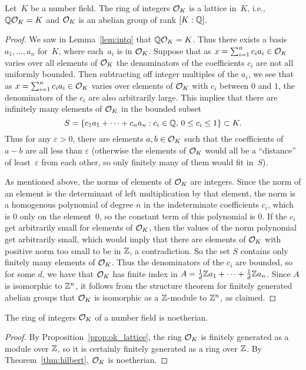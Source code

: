 \begin{proposition}\label{prop:ok_lattice}
  Let~$K$ be a number field.  The ring of integers $\mathcal{O}_K$ is a
  lattice in~$K$, i.e., $\mathbb{Q}\mathcal{O}_K=K$ and $\mathcal{O}_K$ is an abelian group
  of rank $[K:\mathbb{Q}]$.
\end{proposition}
\begin{proof}
  We saw in Lemma~\ref{lem:intq} that $\mathbb{Q}\mathcal{O}_K=K$.  Thus there exists a
  basis $a_1,\dots, a_n$ for~$K$, where each~$a_i$ is in $\mathcal{O}_K$.
  Suppose that as $x=\sum_{i=1}^n c_i a_i\in \mathcal{O}_K$ varies over all
  elements of $\mathcal{O}_K$ the denominators of the coefficients $c_i$ are not
  all uniformly bounded.  Then subtracting off integer multiples of the
  $a_i$, we see that as $x=\sum_{i=1}^n c_i a_i\in \mathcal{O}_K$ varies over
  elements of $\mathcal{O}_K$ with $c_i$ between $0$ and $1$, the denominators of
  the $c_i$ are also arbitrarily large.  This implies that there are
  infinitely many elements of $\mathcal{O}_K$ in the bounded subset
  $$
    S = \left\{
      c_1 a_1 +\cdots + c_n a_n : c_i \in \mathbb{Q},\, 0\leq c_i \leq 1
    \right\} \subset K.
  $$
  Thus for any $\varepsilon>0$, there are elements $a,b\in \mathcal{O}_K$ such that the
  coefficients of $a-b$ are all less than $\varepsilon$ (otherwise the elements
  of $\mathcal{O}_K$ would all be a ``distance''
  of least~$\varepsilon$ from each other, so only finitely
  many of them would fit in~$S$).

  As mentioned above, the norms of elements of $\mathcal{O}_K$ are integers.
  Since the norm of an element is the determinant of left multiplication
  by that element, the norm is a homogenous polynomial of degree $n$ in
  the indeterminate coefficients $c_i$, which is $0$ only on the
  element~$0$, so the constant term of this polynomial is $0$.
  If the $c_i$ get arbitrarily small for elements of
  $\mathcal{O}_K$, then the values of the norm polynomial get arbitrarily small,
  which would imply that there are elements of $\mathcal{O}_K$ with positive norm
  too small to be in $\mathbb{Z}$, a contradiction.  So the set $S$ contains
  only finitely many elements of $\mathcal{O}_K$.  Thus the denominators of the
  $c_i$ are bounded, so for some $d$, we have that $\mathcal{O}_K$ has finite
  index in $A=\frac{1}{d}\mathbb{Z} a_1 + \cdots + \frac{1}{d}\mathbb{Z} a_n$.  Since
  $A$ is isomorphic to $\mathbb{Z}^n$, it follows from the structure theorem for
  finitely generated abelian groups that $\mathcal{O}_K$ is isomorphic as a
  $\mathbb{Z}$-module to $\mathbb{Z}^n$, as claimed.
\end{proof}

\begin{corollary}\label{prop:intnoetherian}
  The ring of integers $\mathcal{O}_K$ of a number field is noetherian.
\end{corollary}
\begin{proof}
  By Proposition~\ref{prop:ok_lattice}, the ring $\mathcal{O}_K$ is
  finitely generated as a module over $\mathbb{Z}$, so it is certainly
  finitely generated as a ring over $\mathbb{Z}$.
  By Theorem~\ref{thm:hilbert}, $\mathcal{O}_K$ is noetherian.
\end{proof}



